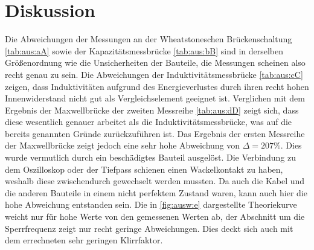 \section{Diskussion}
\label{sec:Diskussion}
Die Abweichungen der Messungen an der Wheatstoneschen Brückenschaltung \ref{tab:aus:aA}
sowie der Kapazitätsmessbrücke \ref{tab:aus:bB} sind in derselben Größenordnung
wie die Unsicherheiten der Bauteile, die Messungen scheinen also recht genau zu sein.
Die Abweichungen der Induktivitätsmessbrücke \ref{tab:aus:cC} zeigen, dass
Induktivitäten aufgrund des Energieverlustes durch ihren recht hohen Innenwiderstand
nicht gut als Vergleichselement geeignet ist. Verglichen mit dem Ergebnis der
Maxwellbrücke der zweiten Messreihe \ref{tab:aus:dD} zeigt sich, dass diese
wesentlich genauer arbeitet als die Induktivitätsmessbrücke, was auf die bereits
genannten Gründe zurückzuführen ist. Das Ergebnis der ersten Messreihe der
Maxwellbrücke zeigt jedoch eine sehr hohe Abweichung von $\Delta = 207 \si{\percent}$.
Dies wurde vermutlich durch ein beschädigtes Bauteil ausgelöst. Die Verbindung zu
dem Oszilloskop oder der Tiefpass schienen einen Wackelkontakt zu haben, weshalb
diese zwischendurch gewechselt werden mussten. Da auch die Kabel und die anderen
Bauteile in einem nicht perfektem Zustand waren, kann auch hier die hohe Abweichung
entstanden sein.
Die in \ref{fig:ausw:e} dargestellte Theoriekurve weicht nur für hohe Werte von
den gemessenen Werten ab, der Abschnitt um die Sperrfrequenz zeigt nur recht
geringe Abweichungen. Dies deckt sich auch mit dem errechneten sehr geringen
Klirrfaktor.
